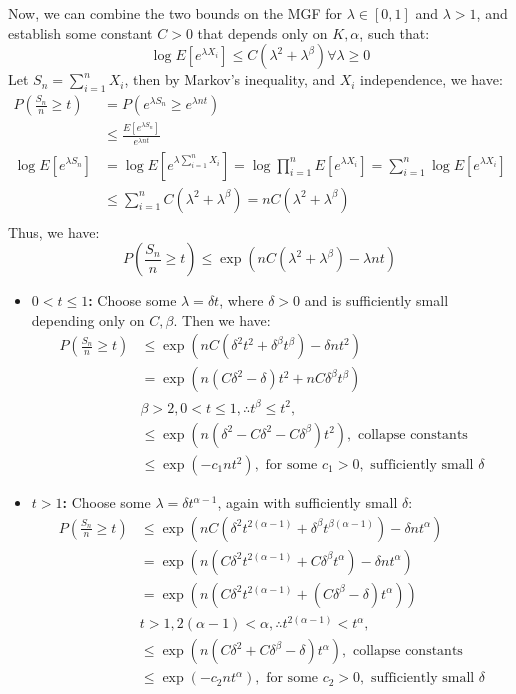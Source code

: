 \documentclass[11pt,a4paper,margin=1in]{article}
\begin{document}
\noindent
Now, we can combine the two bounds on the MGF for $\lambda \in [0, 1]$ and $\lambda > 1$,
and establish some constant $C > 0$ that depends only on $K, \alpha$, such that:
\[
    \log E[e^{\lambda X_i}] \leq C(\lambda^2 + \lambda^\beta) \forall \lambda \geq 0
\]
Let $S_n = \sum_{i=1}^n X_i$, then by Markov's inequality, and $X_i$ independence, 
we have:
\begin{align*}
    P\left(\frac{S_n}{n} \geq t\right) &= P\left(e^{\lambda S_n} \geq e^{\lambda nt}\right) \\
    &\leq \frac{E[e^{\lambda S_n}]}{e^{\lambda nt}} \\
    \log E[e^{\lambda S_n}] &= \log E[e^{\lambda \sum_{i=1}^n X_i}] = \log \prod_{i=1}^n E[e^{\lambda X_i}] = \sum_{i=1}^n \log E[e^{\lambda X_i}] \\
    &\leq \sum_{i=1}^n C(\lambda^2 + \lambda^\beta) = nC(\lambda^2 + \lambda^\beta) \\
\end{align*}
Thus, we have:
\[
    P\left(\frac{S_n}{n} \geq t\right) \leq \exp(nC(\lambda^2 + \lambda^\beta) - \lambda nt)
\]
\begin{itemize}
    \item \textbf{$0 < t \leq 1$:}
    Choose some $\lambda = \delta t$, where $\delta > 0$ and is sufficiently small
    depending only on $C, \beta$. Then we have:
    \begin{align*}
        P\left(\frac{S_n}{n} \geq t\right) &\leq \exp(nC(\delta^2t^2 + \delta^\beta t^\beta) - \delta n t^2) \\
        &= \exp(n(C\delta^2 - \delta)t^2 + nC\delta^\beta t^\beta) \\
        &\beta > 2, 0 < t \leq 1, \therefore t^\beta \leq t^2, \\
        &\leq \exp(n(\delta^2 - C\delta^2 - C\delta^\beta)t^2), \text{ collapse constants} \\
        &\leq \exp(-c_1 nt^2), \text{ for some } c_1 > 0, \text{ sufficiently small } \delta
    \end{align*}
    \item \textbf{$t > 1$:}
    Choose some $\lambda = \delta t^{\alpha - 1}$, again with sufficiently small $\delta$:
    \begin{align*}
        P\left(\frac{S_n}{n} \geq t\right) &\leq \exp(nC(\delta^2 t^{2(\alpha - 1)} + \delta^\beta t^{\beta(\alpha - 1)}) - \delta n t^\alpha) \\
        &= \exp(n(C\delta^2 t^{2(\alpha - 1)} + C\delta^\beta t^\alpha) - \delta n t^\alpha) \\
        &= \exp(n(C\delta^2 t^{2(\alpha - 1)} + (C\delta^\beta - \delta) t^\alpha)) \\
        &t > 1, 2(\alpha - 1) < \alpha, \therefore t^{2(\alpha - 1)} < t^\alpha, \\
        &\leq \exp(n(C\delta^2 + C\delta^\beta - \delta)t^\alpha), \text{ collapse constants} \\
        &\leq \exp(-c_2 nt^\alpha), \text{ for some } c_2 > 0, \text{ sufficiently small } \delta
    \end{align*}
\end{itemize}
\end{document}
